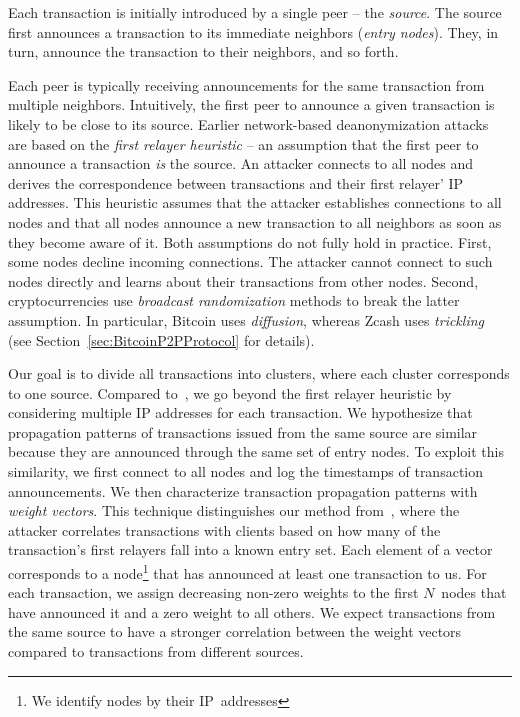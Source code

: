 Each transaction is initially introduced by a single peer -- the \textit{source}.
The source first announces a transaction to its immediate neighbors (\textit{entry nodes}).
They, in turn, announce the transaction to their neighbors, and so forth.

Each peer is typically receiving announcements for the same transaction from multiple neighbors.
Intuitively, the first peer to announce a given transaction is likely to be close to its source.
Earlier network-based deanonymization attacks~\cite{Biryukov2014, Koshy2014} are based on the \textit{first relayer heuristic} -- an assumption that the first peer to announce a transaction \textit{is} the source.
An attacker connects to all nodes and derives the correspondence between transactions and their first relayer' IP addresses.
This heuristic assumes that the attacker establishes connections to all nodes and that all nodes announce a new transaction to all neighbors as soon as they become aware of it.
Both assumptions do not fully hold in practice.
First, some nodes decline incoming connections.
The attacker cannot connect to such nodes directly and learns about their transactions from other nodes.
Second, cryptocurrencies use \textit{broadcast randomization} methods to break the latter assumption.
In particular, Bitcoin uses \textit{diffusion}, whereas Zcash uses \textit{trickling} (see Section~\ref{sec:BitcoinP2PProtocol} for details).

Our goal is to divide all transactions into clusters, where each cluster corresponds to one source.
Compared to~\cite{Koshy2014}, we go beyond the first relayer heuristic by considering multiple IP addresses for each transaction.
We hypothesize that propagation patterns of transactions issued from the same source are similar because they are announced through the same set of entry nodes.
To exploit this similarity, we first connect to all nodes and log the timestamps of transaction announcements.
We then characterize transaction propagation patterns with \textit{weight vectors}.
This technique distinguishes our method from~\cite{Biryukov2014}, where the attacker correlates transactions with clients based on how many of the transaction's first relayers fall into a known entry set.
Each element of a vector corresponds to a node\footnote{We identify nodes by their IP~addresses} that has announced at least one transaction to us.
For each transaction, we assign decreasing non-zero weights to the first $N$~nodes that have announced it and a zero weight to all others.
We expect transactions from the same source to have a stronger correlation between the weight vectors compared to transactions from different sources.

